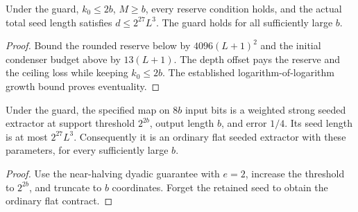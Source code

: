 \begin{theorem}
  \label{thm:lowerbounds-algebraic-gamma-parameters}
  \leanok
  Under the guard, $k_0\le2b$, $M\ge b$, every reserve condition holds,
  and the actual total seed length satisfies $d\le2^{27}L^3$.
  The guard holds for all sufficiently large $b$.
\end{theorem}
\begin{proof}
  \leanok
  Bound the rounded reserve below by $4096(L+1)^2$ and the initial
  condenser budget above by $13(L+1)$. The depth offset pays the reserve
  and the ceiling loss while keeping $k_0\le2b$.
  The established logarithm-of-logarithm growth bound proves eventuality.
\end{proof}

\begin{theorem}
  \label{thm:lowerbounds-algebraic-gamma-extractor}
  \leanok
  Under the guard, the specified map on $8b$ input bits is a weighted
  strong seeded extractor at support threshold $2^{2b}$, output length $b$,
  and error $1/4$. Its seed length is at most $2^{27}L^3$.
  Consequently it is an ordinary flat seeded extractor with these
  parameters, for every sufficiently large $b$.
\end{theorem}
\begin{proof}
  \leanok
  Use the near-halving dyadic guarantee with $e=2$, increase the threshold
  to $2^{2b}$, and truncate to $b$ coordinates. Forget the retained seed
  to obtain the ordinary flat contract.
\end{proof}

